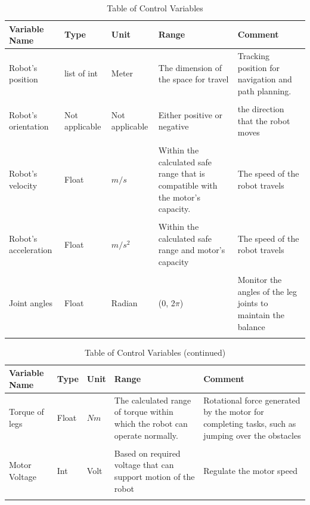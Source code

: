 \documentclass[12pt]{article}
\begin{document}
\begin{table}[H]
\caption{Table of Control Variables} 
\begin{tabularx}{\textwidth}{XXXXX}
\toprule
\textbf{Variable Name} & \textbf{Type} & \textbf{Unit} & \textbf{Range} & \textbf{Comment} \\
\midrule
Robot's position & list of int & Meter & The dimension of the space for travel & Tracking position for navigation and path planning.\\\\
Robot's orientation& Not applicable & Not applicable & Either positive or negative & the direction that the robot moves\\\\
Robot's velocity &  Float &$m/s$ & Within the calculated safe range that is compatible with the motor's capacity.& The speed of the robot travels\\\\
Robot's acceleration &  Float & $m/s^2$& Within the calculated safe range and motor's capacity& The speed of the robot travels\\\\
Joint angles & Float & Radian & (0, 2$\pi$) & Monitor the angles of the leg joints to maintain the balance \\\\


\bottomrule
\end{tabularx}
\end{table}

\begin{table}[H]
\caption{Table of Control Variables (continued)} 
\begin{tabularx}{\textwidth}{XXXXX}
\toprule
\textbf{Variable Name} & \textbf{Type} & \textbf{Unit} & \textbf{Range} & \textbf{Comment} \\
\midrule
Torque of legs & Float & $Nm$ & The calculated range of torque within which the robot can operate normally.& Rotational force generated by the motor for completing tasks, such as jumping over the obstacles\\\\
Motor Voltage & Int & Volt & Based on required voltage that can support motion of the robot& Regulate the motor speed\\\\


\bottomrule
\end{tabularx}
\end{table}
\end{document}
